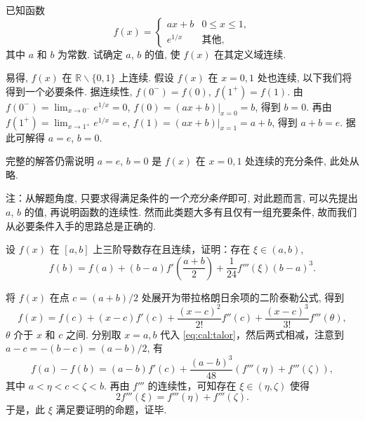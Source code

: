 \begin{exercise}
    已知函数
    \[
    f(x) = \begin{cases}
    ax + b & 0 \le x \le 1, \\
    e^{1/x} & \text{其他},
    \end{cases}\]
    其中 $a$ 和 $b$ 为常数. 试确定 $a$, $b$ 的值, 使 $f(x)$ 在其定义域连续.
\end{exercise}
\begin{solution}
    易得, $f(x)$ 在 $\mathbb{R}\backslash \{0, 1\}$ 上连续. 假设 $f(x)$ 在 $x = 0, 1$ 处也连续, 以下我们将得到一个必要条件. 据连续性, $f(0^-) = f(0)$, $f(1^+) = f(1)$. 由 $f(0^-) = \lim_{x \to 0^-} e^{1/x} = 0$, $f(0) = (ax + b)\vert_{x = 0} = b$, 得到 $b = 0$. 再由 $f(1^+) = \lim_{x \to 1^+} e^{1/x} = e$, $f(1) = (ax + b)\vert_{x = 1} = a + b$, 得到 $a + b = e$. 据此可解得 $a = e$, $b = 0$.
    
    完整的解答仍需说明 $a = e$, $b = 0$ 是 $f(x)$ 在 $x = 0, 1$ 处连续的充分条件, 此处从略. 
    
    {\small 注：从解题角度, 只要求得满足条件的\emph{一个充分条件}即可, 对此题而言, 可以先提出 $a$, $b$ 的值, 再说明函数的连续性. 然而此类题大多有且仅有一组充要条件, 故而我们从必要条件入手的思路总是正确的. }
\end{solution}

\begin{exercise}
    设 $f(x)$ 在 $[a, b]$ 上三阶导数存在且连续，证明：存在 $\xi \in (a, b)$,
    \[
        f(b) = f(a) + (b - a) f'(\frac{a + b}{2}) + \frac{1}{24} f'''(\xi) (b - a)^3.
    \]
\end{exercise}

\begin{solution}
    将 $f(x)$ 在点 $c = (a + b) / 2$ 处展开为带拉格朗日余项的二阶泰勒公式, 得到
    \begin{equation} \label{eq:cal:talor}
        f(x) = f(c) + (x - c) f'(c) + \frac{(x - c)^2}{2!} f''(c) + \frac{(x - c)^3}{3!} f'''(\theta),
    \end{equation}
    $\theta$ 介于 $x$ 和 $c$ 之间. 分别取 $x = a, b$ 代入 \eqref{eq:cal:talor}，然后两式相减，注意到 $a - c = -(b - c) = (a - b) / 2$, 有
    \[
        f(a) - f(b) = (a - b) f'(c) + \frac{(a - b)^3}{48} (f'''(\eta) + f'''(\zeta)),
    \]
    其中 $a < \eta < c < \zeta < b$. 再由 $f'''$ 的连续性，可知存在 $\xi \in (\eta, \zeta)$ 使得
    \[
        2f'''(\xi) = f'''(\eta) + f'''(\zeta).
    \]
    于是，此 $\xi$ 满足要证明的命题，证毕.
\end{solution}

